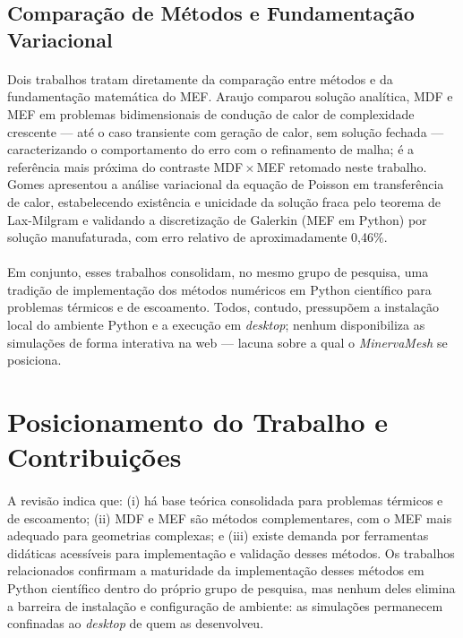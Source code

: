 \subsection{Comparação de Métodos e Fundamentação Variacional}

\paragraph{}Dois trabalhos tratam diretamente da comparação entre métodos e da fundamentação matemática do MEF. Araujo \cite{Araujo2022} comparou solução analítica, MDF e MEF em problemas bidimensionais de condução de calor de complexidade crescente --- até o caso transiente com geração de calor, sem solução fechada --- caracterizando o comportamento do erro com o refinamento de malha; é a referência mais próxima do contraste MDF\,$\times$\,MEF retomado neste trabalho. Gomes \cite{GomesYuri2025} apresentou a análise variacional da equação de Poisson em transferência de calor, estabelecendo existência e unicidade da solução fraca pelo teorema de Lax-Milgram e validando a discretização de Galerkin (MEF em Python) por solução manufaturada, com erro relativo de aproximadamente 0,46\%.

\paragraph{}Em conjunto, esses trabalhos consolidam, no mesmo grupo de pesquisa, uma tradição de implementação dos métodos numéricos em Python científico para problemas térmicos e de escoamento. Todos, contudo, pressupõem a instalação local do ambiente Python e a execução em \textit{desktop}; nenhum disponibiliza as simulações de forma interativa na web --- lacuna sobre a qual o \textit{MinervaMesh} se posiciona.

\section{Posicionamento do Trabalho e Contribuições}
\label{sec:posicionamento_contribuicoes}

\paragraph{}A revisão indica que: (i) há base teórica consolidada para problemas térmicos e de escoamento; (ii) MDF e MEF são métodos complementares, com o MEF mais adequado para geometrias complexas; e (iii) existe demanda por ferramentas didáticas acessíveis para implementação e validação desses métodos. Os trabalhos relacionados confirmam a maturidade da implementação desses métodos em Python científico dentro do próprio grupo de pesquisa, mas nenhum deles elimina a barreira de instalação e configuração de ambiente: as simulações permanecem confinadas ao \textit{desktop} de quem as desenvolveu.

